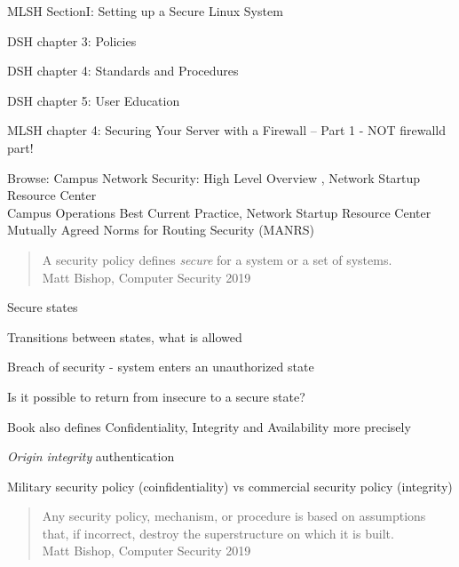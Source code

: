 \documentclass[Screen16to9,17pt]{foils}
\begin{document}

MLSH SectionI: Setting up a Secure Linux System
\begin{list1}
\item DSH chapter 3: Policies
\item DSH chapter 4: Standards and Procedures
\item DSH chapter 5: User Education
\item MLSH chapter 4: Securing Your Server with a
Firewall – Part 1 - NOT firewalld part!

\item Browse: Campus Network Security: High Level Overview , Network Startup Resource Center\\
Campus Operations Best Current Practice, Network Startup Resource Center\\
Mutually Agreed Norms for Routing Security (MANRS)
\end{list1}



\begin{quote}
A security policy defines \emph{secure} for a system or a set of systems.\\
Matt Bishop, Computer Security 2019
\end{quote}

\begin{list1}
\item Secure states
\item Transitions between states, what is allowed
\item Breach of security - system enters an unauthorized state
\item Is it possible to return from insecure to a secure state?
\item Book also defines Confidentiality, Integrity and Availability more precisely
\item \emph{Origin integrity} authentication
\item Military security policy (coinfidentiality) vs commercial security policy (integrity)
\end{list1}


\begin{quote}
Any security policy, mechanism, or procedure is based on assumptions that, if incorrect, destroy the superstructure on which it is built.\\
Matt Bishop, Computer Security 2019
\end{quote}
\end{document}
